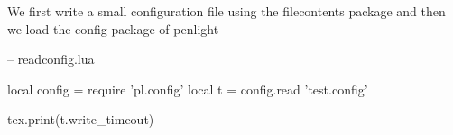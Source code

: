 \documentclass[A3]{article}
\begin{document}
We first write a small configuration file using the filecontents package and then
we load the config package of penlight
\begin{luacode}
  -- readconfig.lua
  
local config       = require 'pl.config'
local t              = config.read 'test.config'

tex.print(t.write_timeout)
\end{luacode}
\end{document}
